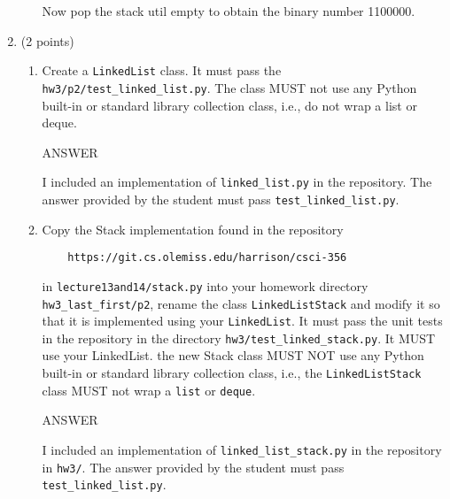 \documentclass{article} %
\begin{document}
\begin{enumerate}
\begin{enumerate}
\begin{minipage}{4.5in}
          Now pop the stack util empty to obtain the binary number 1100000.

          \vspace{.1in}
        \end{minipage}

  \end{enumerate}

\item (2 points)

  \begin{enumerate}
    \item Create a \verb|LinkedList| class.  It must pass the
      \verb|hw3/p2/test_linked_list.py|.  The class MUST not use any
      Python built-in or standard library collection class, i.e., do
      not wrap a list or deque.
  
      \begin{minipage}{4.5in}
        \vspace{.1in}
        ANSWER

        I included an implementation of \verb|linked_list.py| in the
        repository.  The answer provided by the student must pass
        \verb|test_linked_list.py|.
        \vspace{.1in}
      \end{minipage}

  \item   Copy the Stack implementation found in the
  repository

  \begin{verbatim}
    https://git.cs.olemiss.edu/harrison/csci-356
  \end{verbatim}

  in \verb|lecture13and14/stack.py| into your homework directory
  \verb|hw3_last_first/p2|, rename the class \verb|LinkedListStack|
  and modify it so that it is implemented using your \verb|LinkedList|. It
  must pass the unit tests in the repository in the directory
  \verb|hw3/test_linked_stack.py|.  It MUST use your LinkedList.  the
  new Stack class MUST NOT use any Python built-in or standard library
  collection class, i.e., the \verb|LinkedListStack| class MUST not wrap a
  \verb|list| or \verb|deque|.

      \begin{minipage}{4.5in}
        \vspace{.1in}
        ANSWER

        I included an implementation of \verb|linked_list_stack.py| in
        the repository in \verb|hw3/|.  The answer provided by the
        student must pass \verb|test_linked_list.py|.
        \vspace{.1in}
      \end{minipage}


\end{enumerate}
\end{enumerate}
\end{document}
